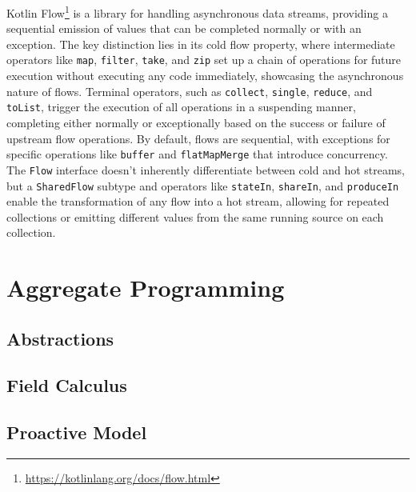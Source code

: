 \documentclass[12pt,a4paper,openright,twoside]{book}
\begin{document}
Kotlin Flow\footnote{\url{https://kotlinlang.org/docs/flow.html}} is a library for handling asynchronous data streams, providing a sequential emission of values that can be completed normally or with an exception. The key distinction lies in its cold flow property, where intermediate operators like \texttt{map}, \texttt{filter}, \texttt{take}, and \texttt{zip} set up a chain of operations for future execution without executing any code immediately, showcasing the asynchronous nature of flows. Terminal operators, such as \texttt{collect}, \texttt{single}, \texttt{reduce}, and \texttt{toList}, trigger the execution of all operations in a suspending manner, completing either normally or exceptionally based on the success or failure of upstream flow operations. By default, flows are sequential, with exceptions for specific operations like \texttt{buffer} and \texttt{flatMapMerge} that introduce concurrency. The \texttt{Flow} interface doesn't inherently differentiate between cold and hot streams, but a \texttt{SharedFlow} subtype and operators like \texttt{stateIn}, \texttt{shareIn}, and \texttt{produceIn} enable the transformation of any flow into a hot stream, allowing for repeated collections or emitting different values from the same running source on each collection.






\section{Aggregate Programming}

\subsection{Abstractions}


\subsection{Field Calculus}

\subsection{Proactive Model}
\end{document}

